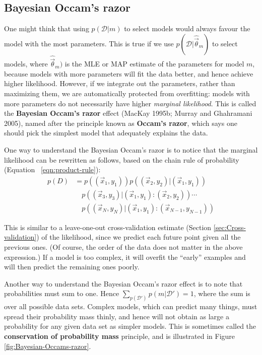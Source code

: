 \subsection{Bayesian Occam's razor}
One might think that using $p(\mathcal{D}|m)$ to select models would always favour the model with the most parameters. This is true if we use $p(\mathcal{D}|\hat{\vec{\theta}}_m)$ to select models, where $\hat{\vec{\theta}}_m)$ is the MLE or MAP estimate of the parameters for model $m$, because models with more parameters will fit the data better, and hence achieve higher likelihood. However, if we integrate out the parameters, rather than maximizing them, we are automatically protected from overfitting: models with more parameters do not necessarily have higher \emph{marginal likelihood}. This is called the \textbf{Bayesian Occam’s razor} effect (MacKay 1995b; Murray and Ghahramani 2005), named after the principle known as \textbf{Occam’s razor}, which says one should pick the simplest model that adequately explains the data.

One way to understand the Bayesian Occam’s razor is to notice that the marginal likelihood can be rewritten as follows, based on the chain rule of probability (Equation ~\eqref{eqn:product-rule}):
\begin{equation}\begin{split}
p(D) & =p((\vec{x}_1,y_1))p((\vec{x}_2,y_2)|(\vec{x}_1,y_1)) \\
     & \quad p((\vec{x}_3,y_3)|(\vec{x}_1,y_1):(\vec{x}_2,y_2))\cdots \\
	 & \quad p((\vec{x}_N,y_N)|(\vec{x}_1,y_1):(\vec{x}_{N-1},y_{N-1}))
\end{split}\end{equation}

This is similar to a leave-one-out cross-validation estimate (Section \ref{sec:Cross-validation}) of the likelihood, since we predict each future point given all the previous ones. (Of course, the order of the data does not matter in the above expression.) If a model is too complex, it will overfit the “early” examples and will then predict the remaining ones poorly.

Another way to understand the Bayesian Occam’s razor effect is to note that probabilities must sum to one. Hence $\sum_{p(\mathcal{D}')} p(m|\mathcal{D}')=1$, where the sum is over all possible data sets. Complex models, which can predict many things, must spread their probability mass thinly, and hence will not obtain as large a probability for any given data set as simpler models. This is sometimes called the \textbf{conservation of probability mass} principle, and is illustrated in Figure \ref{fig:Bayesian-Occams-razor}.

